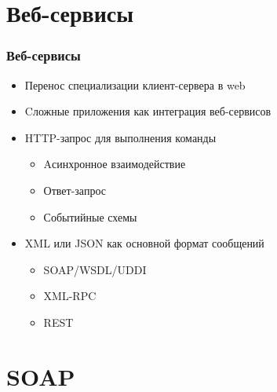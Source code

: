 \documentclass[xetex,mathserif,serif]{beamer}
\begin{document}
    \section{Веб-сервисы}

    \begin{frame}
        \frametitle{Веб-сервисы}
        \begin{itemize}
            \item Перенос специализации клиент-сервера в web
            \item Cложные приложения как интеграция веб-сервисов
            \item HTTP-запрос для выполнения команды
            \begin{itemize}
                \item Aсинхронное взаимодействие
                \item Ответ-запрос
                \item Событийные схемы
            \end{itemize}
            \item XML или JSON как основной формат сообщений
            \begin{itemize}
                \item SOAP/WSDL/UDDI
                \item XML-RPC
                \item REST
            \end{itemize}
        \end{itemize}
    \end{frame}

    \section{SOAP}
\end{document}
